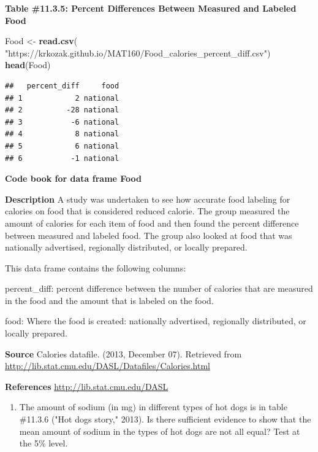 \documentclass[
]{book}
\newenvironment{Shaded}{\begin{snugshade}}{\end{snugshade}}
\newcommand{\KeywordTok}[1]{\textcolor[rgb]{0.13,0.29,0.53}{\textbf{#1}}}
\newcommand{\NormalTok}[1]{#1}
\newcommand{\StringTok}[1]{\textcolor[rgb]{0.31,0.60,0.02}{#1}}
\providecommand{\tightlist}{%
  \setlength{\itemsep}{0pt}\setlength{\parskip}{0pt}}
\begin{document}
\textbf{Table \#11.3.5: Percent Differences Between Measured and Labeled Food}

\begin{Shaded}
\begin{Highlighting}[]
\NormalTok{Food <-}\StringTok{ }\KeywordTok{read.csv}\NormalTok{(}
  \StringTok{"https://krkozak.github.io/MAT160/Food_calories_percent_diff.csv"}\NormalTok{)}
\KeywordTok{head}\NormalTok{(Food)}
\end{Highlighting}
\end{Shaded}

\begin{verbatim}
##   percent_diff     food
## 1            2 national
## 2          -28 national
## 3           -6 national
## 4            8 national
## 5            6 national
## 6           -1 national
\end{verbatim}

\textbf{Code book for data frame Food}

\textbf{Description}
A study was undertaken to see how accurate food labeling for calories on food that is considered reduced calorie. The group measured the amount of calories for each item of food and then found the percent difference between measured and labeled food. The group also looked at food that was nationally advertised, regionally distributed, or locally prepared.

This data frame contains the following columns:

percent\_diff: percent difference between the number of calories that are measured in the food and the amount that is labeled on the food.

food: Where the food is created: nationally advertised, regionally distributed, or locally prepared.

\textbf{Source}
Calories datafile. (2013, December 07). Retrieved from \url{http://lib.stat.cmu.edu/DASL/Datafiles/Calories.html}

\textbf{References}
\url{http://lib.stat.cmu.edu/DASL}

\begin{enumerate}
\def\labelenumi{\arabic{enumi}.}
\setcounter{enumi}{4}
\tightlist
\item
  The amount of sodium (in mg) in different types of hot dogs is in table \#11.3.6 ("Hot dogs story," 2013). Is there sufficient evidence to show that the mean amount of sodium in the types of hot dogs are not all equal? Test at the 5\% level.
\end{enumerate}
\end{document}
